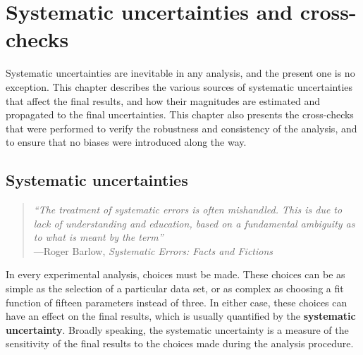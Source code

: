 \chapter{Systematic uncertainties and cross-checks}
\label{chapter_systematics}
Systematic uncertainties are inevitable in any analysis, and the present one is no exception. This chapter describes the various sources of systematic uncertainties that affect the final results, and how their magnitudes are estimated and propagated to the final uncertainties. This chapter also presents the cross-checks that were performed to verify the robustness and consistency of the analysis, and to ensure that no biases were introduced along the way.

\section{Systematic uncertainties}
\label{sec:systematics}
\begin{quote}
    \textit{``The treatment of systematic errors is often mishandled. This is due to lack of understanding and education, based on a fundamental ambiguity as to what is meant by the term''}\\
    \hspace*{1cm}---Roger Barlow, \textit{Systematic Errors: Facts and Fictions}~\cite{BarlowCheck}
\end{quote}

In every experimental analysis, choices must be made. These choices can be as simple as the selection of a particular data set, or as complex as choosing a fit function of fifteen parameters instead of three. In either case, these choices can have an effect on the final results, which is usually quantified by the \textbf{systematic uncertainty}. Broadly speaking, the systematic uncertainty is a measure of the sensitivity of the final results to the choices made during the analysis procedure. 

